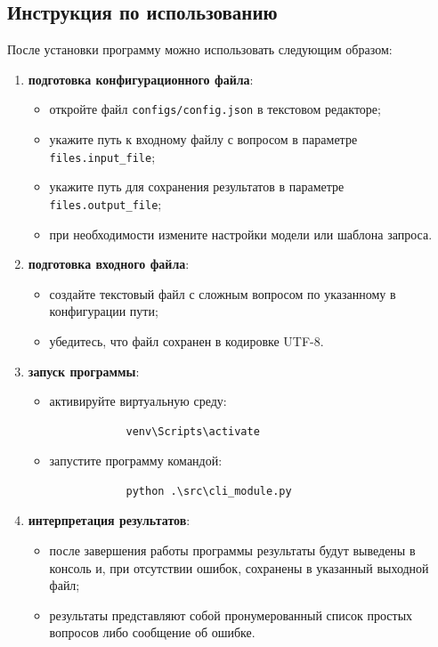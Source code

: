 \subsection{Инструкция по использованию}

После установки программу можно использовать следующим образом:

\begin{enumerate}
	\item \textbf{подготовка конфигурационного файла}:
	\begin{itemize}
		\item откройте файл \texttt{configs/config.json} в текстовом редакторе;
		\item укажите путь к входному файлу с вопросом в параметре \texttt{files.input\_file};
		\item укажите путь для сохранения результатов в параметре \texttt{files.output\_file};
		\item при необходимости измените настройки модели или шаблона запроса.
	\end{itemize}

	\item \textbf{подготовка входного файла}:
	\begin{itemize}
		\item создайте текстовый файл с сложным вопросом по указанному в конфигурации пути;
		\item убедитесь, что файл сохранен в кодировке UTF-8.
	\end{itemize}

	\item \textbf{запуск программы}:
	\begin{itemize}
		\item активируйте виртуальную среду:
		\begin{verbatim}
			venv\Scripts\activate
		\end{verbatim}
		\item запустите программу командой:
		\begin{verbatim}
			python .\src\cli_module.py
		\end{verbatim}
	\end{itemize}

	\item \textbf{интерпретация результатов}:
	\begin{itemize}
		\item после завершения работы программы результаты будут выведены в консоль и, при отсутствии ошибок, сохранены в указанный выходной файл;
		\item результаты представляют собой пронумерованный список простых вопросов либо сообщение об ошибке.
	\end{itemize}
\end{enumerate}

